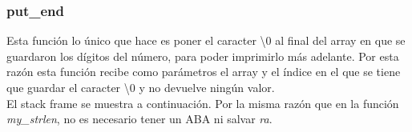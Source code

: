 \documentclass[a4paper,10pt]{article}
\begin{document}
\begin{center}
\begin{drawstack}
	\startframe
	 
	 
	 
	 
	\startframe
	 
	 
	\startframe
	 
	 
	 
	 
\end{drawstack}
\end{center}

\subsubsection{put\_end}
Esta función lo único que hace es poner el caracter \textbackslash0 al final del array en que se guardaron los dígitos del número, para poder imprimirlo más adelante. Por esta razón esta función recibe como parámetros el array y el índice en el que se tiene que guardar el caracter \textbackslash0 y no devuelve ningún valor. \\
El stack frame se muestra a continuación. Por la misma razón que en la función \textit{my\_strlen}, no es necesario tener un ABA ni salvar \textit{ra}.
\end{document}
